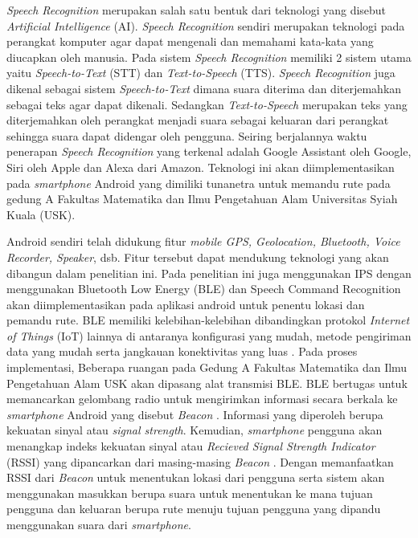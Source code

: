 \newpage

\par \textit{Speech Recognition} merupakan salah satu bentuk dari teknologi yang disebut \textit{Artificial Intelligence} (AI). \textit{Speech Recognition} sendiri merupakan teknologi pada perangkat komputer agar dapat mengenali dan memahami kata-kata yang diucapkan oleh manusia. Pada sistem \textit{Speech Recognition} memiliki 2 sistem utama yaitu \textit{Speech-to-Text} (STT) dan \textit{Text-to-Speech} (TTS). \textit{Speech Recognition} juga dikenal sebagai sistem \textit{Speech-to-Text} dimana suara diterima dan diterjemahkan sebagai teks agar dapat dikenali. 
Sedangkan \textit{Text-to-Speech} merupakan teks yang diterjemahkan oleh perangkat menjadi suara sebagai keluaran dari perangkat sehingga suara dapat didengar oleh pengguna. Seiring berjalannya waktu penerapan \textit{Speech Recognition} yang terkenal adalah Google Assistant oleh Google, Siri oleh Apple dan Alexa dari Amazon. Teknologi ini akan diimplementasikan pada \textit{smartphone} Android yang dimiliki tunanetra untuk memandu rute pada gedung A Fakultas Matematika dan Ilmu Pengetahuan Alam Universitas Syiah Kuala (USK).

\par Android sendiri telah didukung fitur \textit{mobile GPS, Geolocation, Bluetooth, Voice Recorder, Speaker}, dsb. Fitur tersebut dapat mendukung teknologi yang akan dibangun dalam
penelitian ini. Pada penelitian ini juga menggunakan IPS dengan menggunakan Bluetooth
Low Energy (BLE) dan Speech Command Recognition akan diimplementasikan pada aplikasi android untuk penentu lokasi dan pemandu rute. BLE memiliki kelebihan-kelebihan dibandingkan protokol \textit{Internet of Things} (IoT) lainnya di antaranya konfigurasi yang mudah, metode pengiriman data yang mudah serta jangkauan konektivitas yang luas \citep{puspitasari2020}. Pada proses implementasi, Beberapa ruangan pada Gedung A Fakultas Matematika dan Ilmu Pengetahuan Alam USK akan dipasang alat transmisi BLE. BLE bertugas untuk memancarkan gelombang radio untuk mengirimkan informasi secara berkala ke \textit{smartphone} Android yang disebut \textit{Beacon} \citep{lin2018interactive}. Informasi yang diperoleh berupa kekuatan sinyal atau \textit{signal strength}. Kemudian, \textit{smartphone} pengguna akan menangkap indeks kekuatan sinyal atau \textit{Recieved Signal Strength Indicator} (RSSI) yang dipancarkan dari masing-masing \textit{Beacon} \citep{li2018indoor}. Dengan memanfaatkan RSSI dari \textit{Beacon} untuk menentukan lokasi dari pengguna serta sistem akan menggunakan masukkan berupa suara untuk menentukan ke mana tujuan pengguna dan keluaran berupa rute menuju tujuan pengguna yang dipandu menggunakan suara dari \textit{smartphone}.

